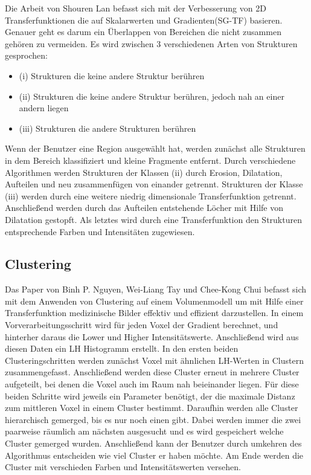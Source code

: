 Die Arbeit von Shouren Lan \cite{lan2017improving} befasst sich mit der Verbesserung von 2D Transferfunktionen die auf Skalarwerten und Gradienten(SG-TF) basieren. Genauer geht es darum ein Überlappen von Bereichen die nicht zusammen gehören zu vermeiden.
\newline
Es wird zwischen 3 verschiedenen Arten von Strukturen gesprochen:
\begin{itemize}
\item (i) Strukturen die keine andere Struktur berühren
\item (ii) Strukturen die keine andere Struktur berühren, jedoch nah an einer andern liegen
\item (iii) Strukturen die andere Strukturen berühren
\end{itemize} 
Wenn der Benutzer eine Region ausgewählt hat, werden zunächst alle Strukturen in dem Bereich klassifiziert und kleine Fragmente entfernt. Durch verschiedene Algorithmen werden Strukturen der Klassen (ii) durch Erosion, Dilatation, Aufteilen und neu zusammenfügen von einander getrennt. Strukturen der Klasse (iii) werden durch eine weitere niedrig dimensionale Transferfunktion getrennt. Anschließend werden durch das Aufteilen entstehende Löcher mit Hilfe von Dilatation gestopft. Als letztes wird durch eine Transferfunktion den Strukturen entsprechende Farben und Intensitäten zugewiesen.


\subsection{Clustering}

Das Paper von Binh P. Nguyen, Wei-Liang Tay und Chee-Kong Chui \cite{nguyen2012clustering} befasst sich mit dem Anwenden von Clustering auf einem Volumenmodell um mit Hilfe einer Transferfunktion medizinische Bilder effektiv und effizient darzustellen.
\newline
In einem Vorverarbeitungsschritt wird für jeden Voxel der Gradient berechnet, und hinterher daraus die Lower und Higher Intensitätswerte. Anschließend wird aus diesen Daten ein LH Histogramm erstellt.
\newline
In den ersten beiden Clusteringschritten werden zunächst Voxel mit ähnlichen  LH-Werten in Clustern zusammengefasst. Anschließend werden diese Cluster erneut in mehrere Cluster aufgeteilt, bei denen die Voxel auch im Raum nah beieinander liegen. Für diese beiden Schritte wird jeweils ein Parameter benötigt, der die maximale Distanz zum mittleren Voxel in einem Cluster bestimmt. Daraufhin werden alle Cluster hierarchisch gemerged, bis es nur noch einen gibt. Dabei werden immer die zwei paarweise räumlich am nächsten ausgesucht und es wird gespeichert welche Cluster gemerged wurden. Anschließend kann der Benutzer durch umkehren des Algorithmus entscheiden wie viel Cluster er haben möchte. Am Ende werden die Cluster mit verschieden Farben und Intensitätswerten versehen.



